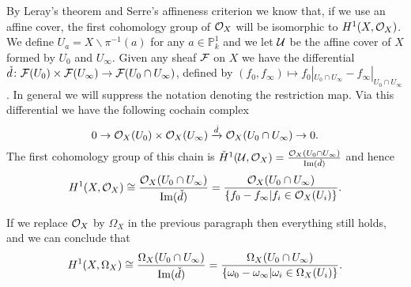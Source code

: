 By Leray's theorem \cite[Thm. 5.2.12]{liu} and Serre's affineness criterion \cite[Thm. 5.2.23]{liu} we know that, if we use an affine cover, the first \cech cohomology group of ${\cal O}_X$ will be isomorphic to $H^1(X,\mathcal{O}_X)$.
We define $U_a = X \backslash \pi^{-1}(a)$ for any $a \in \mathbb P_k^1$ and we let ${\cal U}$ be the affine cover of $X$ formed by $U_0$ and $U_\infty$.
Given any sheaf $\cal F$ on $X$ we have the \cech differential $\check{d}\colon {\cal F}(U_0) \times {\cal F} (U_\infty) \rightarrow {\cal F}(U_0 \cap U_\infty)$, defined by $(f_0,f_\infty) \mapsto f_0|_{U_0 \cap U_\infty} - f_\infty|_{U_0 \cap U_\infty}$.
In general we will suppress the notation denoting the restriction map.
Via this differential we have the following cochain complex
    \begin{equation*}
    0 \rightarrow {\cal O}_X(U_0)\times {\cal O}_X(U_\infty) \xrightarrow{\check{d}} {\cal O}_X(U_0 \cap U_\infty) \rightarrow 0.
    \end{equation*}
The first cohomology group of this chain is $\check{H}^1(\mathcal U,\mathcal O_X) = \frac{{\cal O}_X(U_0 \cap U_\infty)}{\operatorname{Im}(\check{d})}$ and hence
    \begin{equation}\label{cechhone}
    H^1(X,\mathcal{O}_X) \cong \frac{{\cal O}_X(U_0 \cap U_\infty)}{\operatorname{Im}(\check{d})}  
     = \frac{{\cal O}_X(U_0 \cap U_\infty)}{\{f_0 - f_\infty | f_i \in {\cal O}_X(U_i) \}}.
    \end{equation}

If we replace ${\cal O}_X$ by $\Omega_X$ in the previous paragraph then everything still holds, and we can conclude that
    \[
    H^1(X,\Omega_X) \cong \frac{\Omega_X(U_0 \cap U_\infty)}{\operatorname{Im}(\check{d})} = \frac{\Omega_X(U_0 \cap U_\infty)}{\{\omega_0 - \omega_ \infty | \omega_i \in \Omega_X(U_i)\}}.
    \]

